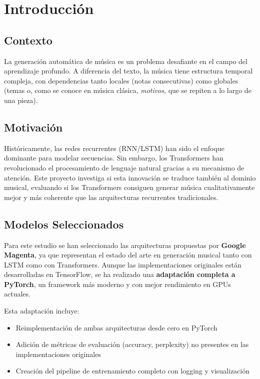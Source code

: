 \documentclass[12pt,a4paper]{article}
\begin{document}
\section{Introducción}

\subsection{Contexto}
La generación automática de música es un problema desafiante en el campo del aprendizaje profundo. A diferencia del texto, la música tiene estructura temporal compleja, con dependencias tanto locales (notas consecutivas) como globales (temas o, como se conoce en música clásica, \textit{motivos}, que se repiten a lo largo de una pieza).

\subsection{Motivación}
Históricamente, las redes recurrentes (RNN/LSTM) han sido el enfoque dominante para modelar secuencias. Sin embargo, los Transformers han revolucionado el procesamiento de lenguaje natural gracias a su mecanismo de atención. Este proyecto investiga si esta innovación se traduce también al dominio musical, evaluando si los Transformers consiguen generar música cualitativamente mejor y más coherente que las arquitecturas recurrentes tradicionales.

\subsection{Modelos Seleccionados}

Para este estudio se han seleccionado las arquitecturas propuestas por \textbf{Google Magenta}, ya que representan el estado del arte en generación musical tanto con LSTM como con Transformers. Aunque las implementaciones originales están desarrolladas en TensorFlow, se ha realizado una \textbf{adaptación completa a PyTorch}, un framework más moderno y con mejor rendimiento en GPUs actuales.

Esta adaptación incluye:
\begin{itemize}
    \item Reimplementación de ambas arquitecturas desde cero en PyTorch
    \item Adición de métricas de evaluación (accuracy, perplexity) no presentes en las implementaciones originales
    \item Creación del pipeline de entrenamiento completo con logging y visualización
\end{itemize}
\end{document}

